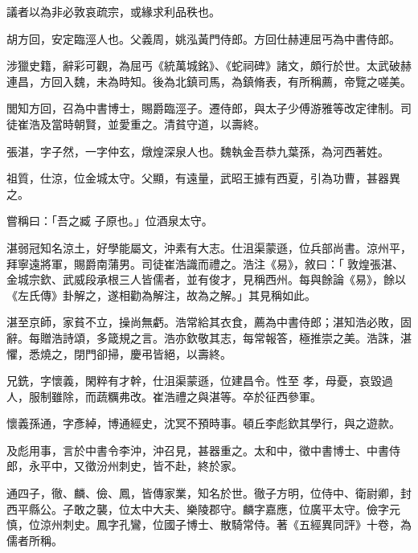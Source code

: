 \begin{pinyinscope}
 議者以為非必敦哀疏宗，或緣求利品秩也。



 胡方回，安定臨涇人也。父義周，姚泓黃門侍郎。方回仕赫連屈丐為中書侍郎。



 涉獵史籍，辭彩可觀，為屈丐《統萬城銘》、《蛇祠碑》諸文，頗行於世。太武破赫連昌，方回入魏，未為時知。後為北鎮司馬，為鎮脩表，有所稱薦，帝覽之嗟美。



 閭知方回，召為中書博士，賜爵臨涇子。遷侍郎，與太子少傅游雅等改定律制。司徒崔浩及當時朝賢，並愛重之。清貧守道，以壽終。



 張湛，字子然，一字仲玄，燉煌深泉人也。魏執金吾恭九葉孫，為河西著姓。



 祖質，仕涼，位金城太守。父顯，有遠量，武昭王據有西夏，引為功曹，甚器異之。



 嘗稱曰：「吾之臧
 子原也。」位酒泉太守。



 湛弱冠知名涼土，好學能屬文，沖素有大志。仕沮渠蒙遜，位兵部尚書。涼州平，拜寧遠將軍，賜爵南蒲男。司徒崔浩識而禮之。浩注《易》，敘曰：「敦煌張湛、金城宗欽、武威段承根三人皆儒者，並有俊才，見稱西州。每與餘論《易》，餘以《左氏傳》卦解之，遂相勸為解注，故為之解。」其見稱如此。



 湛至京師，家貧不立，操尚無虧。浩常給其衣食，薦為中書侍郎；湛知浩必敗，固辭。每贈浩詩頌，多箴規之言。浩亦欽敬其志，每常報答，極推崇之美。浩誅，湛懼，悉燒之，閉門卻掃，慶弔皆絕，以壽終。



 兄銑，字懷義，閑粹有才幹，仕沮渠蒙遜，位建昌令。性至
 孝，母憂，哀毀過人，服制雖除，而蔬糲弗改。崔浩禮之與湛等。卒於征西參軍。



 懷義孫通，字彥綽，博通經史，沈冥不預時事。頓丘李彪欽其學行，與之遊款。



 及彪用事，言於中書令李沖，沖召見，甚器重之。太和中，徵中書博士、中書侍郎，永平中，又徵汾州刺史，皆不赴，終於家。



 通四子，徹、麟、儉、鳳，皆傳家業，知名於世。徹子方明，位侍中、衛尉卿，封西平縣公。子敢之襲，位太中大夫、樂陵郡守。麟字嘉應，位廣平太守。儉字元慎，位涼州刺史。鳳字孔鸞，位國子博士、散騎常侍。著《五經異同評》十卷，為儒者所稱。




\end{pinyinscope}
